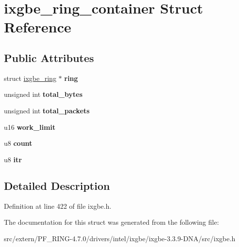 \hypertarget{structixgbe__ring__container}{
\section{ixgbe\_\-ring\_\-container Struct Reference}
\label{structixgbe__ring__container}
}
\subsection*{Public Attributes}
\begin{DoxyCompactItemize}
\item 
\hypertarget{structixgbe__ring__container_ab6810a24f15a49e7eec6ac7b3993fe04}{
struct \hyperlink{structixgbe__ring}{ixgbe\_\-ring} $\ast$ {\bfseries ring}}
\label{structixgbe__ring__container_ab6810a24f15a49e7eec6ac7b3993fe04}

\item 
\hypertarget{structixgbe__ring__container_a4c462573da264f00950b14811f18c41c}{
unsigned int {\bfseries total\_\-bytes}}
\label{structixgbe__ring__container_a4c462573da264f00950b14811f18c41c}

\item 
\hypertarget{structixgbe__ring__container_a9b090be6b46b7b646e5ba7393aafe4bf}{
unsigned int {\bfseries total\_\-packets}}
\label{structixgbe__ring__container_a9b090be6b46b7b646e5ba7393aafe4bf}

\item 
\hypertarget{structixgbe__ring__container_a668564f00064a0ec068992d809c59b49}{
u16 {\bfseries work\_\-limit}}
\label{structixgbe__ring__container_a668564f00064a0ec068992d809c59b49}

\item 
\hypertarget{structixgbe__ring__container_a3aefdcc28b3426db747b477eeff5101b}{
u8 {\bfseries count}}
\label{structixgbe__ring__container_a3aefdcc28b3426db747b477eeff5101b}

\item 
\hypertarget{structixgbe__ring__container_af6a5e47a7127caba7432d57122740e2c}{
u8 {\bfseries itr}}
\label{structixgbe__ring__container_af6a5e47a7127caba7432d57122740e2c}

\end{DoxyCompactItemize}


\subsection{Detailed Description}


Definition at line 422 of file ixgbe.h.



The documentation for this struct was generated from the following file:\begin{DoxyCompactItemize}
\item 
src/extern/PF\_\-RING-\/4.7.0/drivers/intel/ixgbe/ixgbe-\/3.3.9-\/DNA/src/ixgbe.h\end{DoxyCompactItemize}
